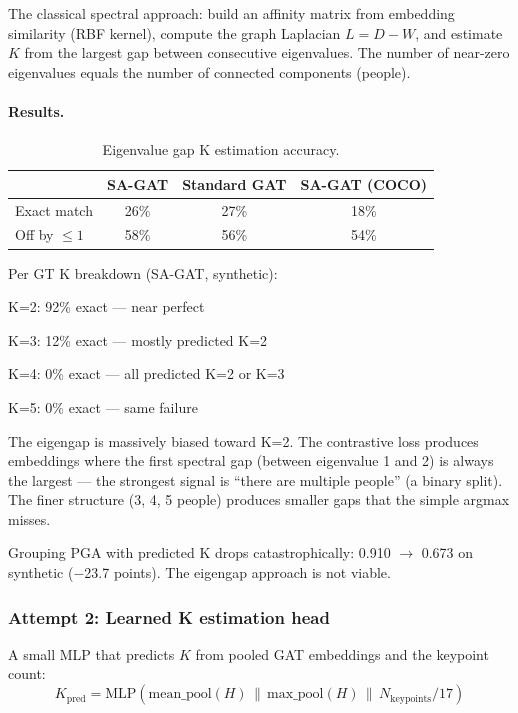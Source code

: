 The classical spectral approach: build an affinity matrix from embedding similarity (RBF kernel), compute the graph Laplacian $L = D - W$, and estimate $K$ from the largest gap between consecutive eigenvalues. The number of near-zero eigenvalues equals the number of connected components (people).

\paragraph{Results.}

\begin{table}[H]
\centering
\footnotesize
\begin{tabular}{lccc}
\toprule
 & SA-GAT & Standard GAT & SA-GAT (COCO) \\
\midrule
Exact match & 26\% & 27\% & 18\% \\
Off by $\leq 1$ & 58\% & 56\% & 54\% \\
\bottomrule
\end{tabular}
\caption{Eigenvalue gap K estimation accuracy.}
\end{table}

Per GT K breakdown (SA-GAT, synthetic):
\begin{compactitem}
  \item K=2: 92\% exact --- near perfect
  \item K=3: 12\% exact --- mostly predicted K=2
  \item K=4: 0\% exact --- all predicted K=2 or K=3
  \item K=5: 0\% exact --- same failure
\end{compactitem}

The eigengap is massively biased toward K=2. The contrastive loss produces embeddings where the first spectral gap (between eigenvalue 1 and 2) is always the largest --- the strongest signal is ``there are multiple people'' (a binary split). The finer structure (3, 4, 5 people) produces smaller gaps that the simple argmax misses.

Grouping PGA with predicted K drops catastrophically: 0.910 $\to$ 0.673 on synthetic ($-$23.7 points). The eigengap approach is not viable.


\subsubsection{Attempt 2: Learned K estimation head}

A small MLP that predicts $K$ from pooled GAT embeddings and the keypoint count:
\[
K_{\text{pred}} = \text{MLP}(\text{mean\_pool}(H) \,\|\, \text{max\_pool}(H) \,\|\, N_{\text{keypoints}} / 17)
\]

